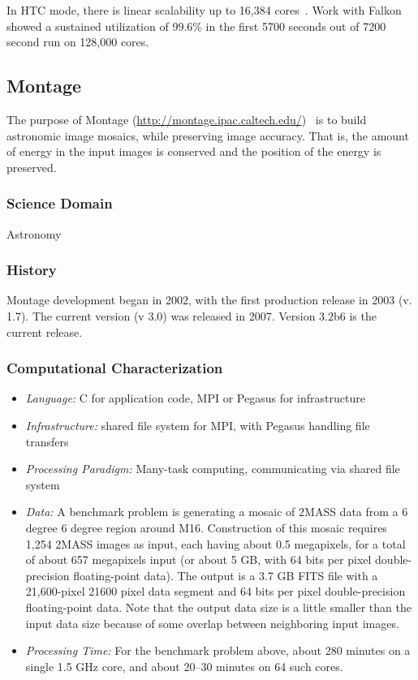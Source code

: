 \documentclass[10pt,letterpaper]{article}
\begin{document}
In HTC mode, there is linear scalability up to 16,384 cores~\cite{IBM-DOCK-08}. Work with Falkon showed a sustained utilization of 99.6\% in the first 5700 seconds out of 7200 second run on 128,000 cores.~\cite{FALKON-SC-08}

\subsection{Montage\label{sec:montage}}


The purpose of Montage (\url{http://montage.ipac.caltech.edu/})~\cite{montage1,montage2} is to build astronomic image mosaics, while preserving image accuracy.
That is, the amount of energy in the input images is conserved and the position of the energy is preserved.

\subsubsection{Science Domain} Astronomy

\subsubsection{History}

Montage development began in 2002, with the first production release in 2003 (v. 1.7).  The current version (v 3.0) was released in 2007.  Version 3.2b6 is the current release. 


\subsubsection{Computational Characterization}

\begin {itemize}
\item {\em Language:} C for application code, MPI or Pegasus for infrastructure
\item {\em Infrastructure:} shared file system for MPI, with Pegasus handling file transfers
\item {\em Processing Paradigm:} Many-task computing, communicating via shared file system
\item {\em Data:} A benchmark problem is
generating a mosaic of 2MASS data from a 6 degree  6 degree
region around M16.  Construction of this mosaic requires 1,254 2MASS
images as input, each having about 0.5 megapixels, for a total of
about 657 megapixels input (or about 5 GB, with 64 bits per pixel
double-precision floating-point data).  The output is a 3.7 GB FITS
file with a 21,600-pixel  21600 pixel data segment and 64
bits per pixel double-precision floating-point data.  Note that the
output data size is a little smaller than the input data size because
of some overlap  between neighboring input images.
\item {\em Processing Time:} For the benchmark problem above, about 280 minutes on a single 1.5 GHz core, and about 20--30 minutes on 64 such cores.
\end {itemize}
\end{document}
